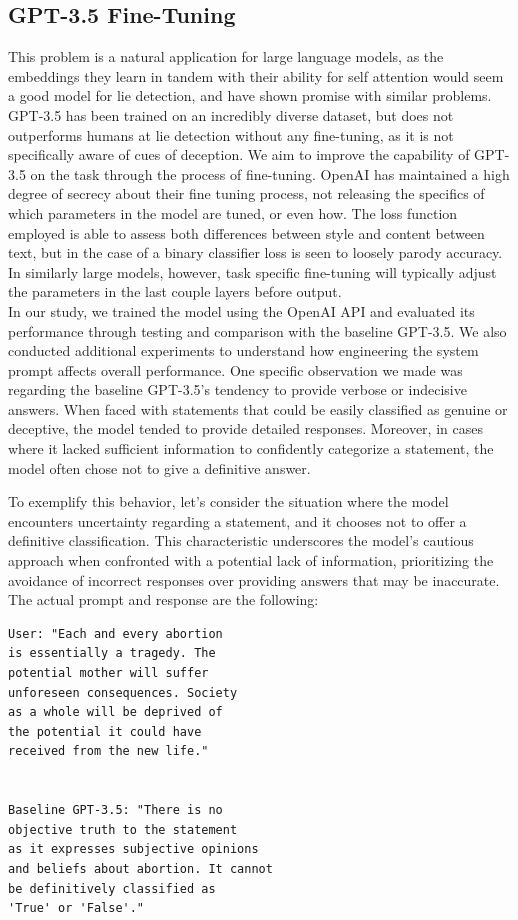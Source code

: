 \documentclass[10pt,twocolumn,letterpaper]{article}
\begin{document}
\subsection{GPT-3.5 Fine-Tuning}

This problem is a natural application for large language models, as the embeddings they learn in tandem
with their ability for self attention would seem a good model for lie detection, and have shown promise with
similar problems. GPT-3.5 has been trained on an incredibly diverse dataset, but does not outperforms humans at lie
detection without any fine-tuning, as it is not specifically aware of cues of deception. We aim to improve the
capability of GPT-3.5 on the task through the process of fine-tuning. OpenAI has maintained a high degree of
secrecy about their fine tuning process, not releasing the specifics of which parameters in the model
are tuned, or even how. The loss function employed is able to assess both differences between style and 
content between text, but in the case of a binary classifier loss is seen to loosely parody accuracy. 
In similarly large models, however, task specific fine-tuning will typically adjust the parameters in the 
last couple layers before output. \\

In our study, we trained the model using the OpenAI API and evaluated its performance through testing 
and comparison with the baseline GPT-3.5. We also conducted additional experiments to understand how engineering 
the system prompt affects overall performance. One specific observation we made was regarding the baseline 
GPT-3.5's tendency to provide verbose or indecisive answers. When faced with statements that could be easily 
classified as genuine or deceptive, the model tended to provide detailed responses. Moreover, in cases where 
it lacked sufficient information to confidently categorize a statement, the model often chose not to give a 
definitive answer.

To exemplify this behavior, let's consider the situation where the model encounters uncertainty 
regarding a statement, and it chooses not to offer a definitive classification. This characteristic underscores
the model's cautious approach when confronted with a potential lack of information, prioritizing the avoidance
of incorrect responses over providing answers that may be inaccurate. The actual prompt and response are the following:

\begin{verbatim}
User: "Each and every abortion 
is essentially a tragedy. The 
potential mother will suffer 
unforeseen consequences. Society
as a whole will be deprived of 
the potential it could have 
received from the new life."

   
Baseline GPT-3.5: "There is no 
objective truth to the statement 
as it expresses subjective opinions
and beliefs about abortion. It cannot 
be definitively classified as 
'True' or 'False'."
\end{verbatim}   
\end{document}
